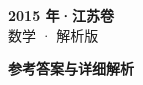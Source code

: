 \documentclass[zihao=-4, a4paper]{ctexart}
\begin{document}
\begin{center}
  {\Large\bfseries 2015 年·江苏卷}\\[4pt]
  {\large 数学 · 解析版}
\end{center}
\medskip
{}

\clearpage
{}
\begin{center}{\Large\bfseries 参考答案与详细解析}\end{center}
\medskip

\end{document}
